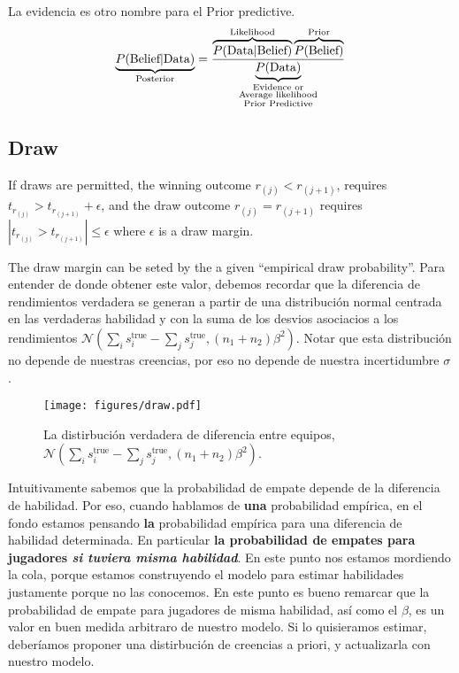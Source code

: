 \documentclass[article]{jss}
\newcommand{\N}{\mathcal{N}}
\newcommand\hfrac[2]{\genfrac{}{}{0pt}{}{#1}{#2}} %
\begin{document}

La evidencia es otro nombre para el Prior predictive.
%
\begin{equation*}
\underbrace{P(\text{Belief}|\text{Data})}_{\text{\scriptsize Posterior}} = \frac{\overbrace{P(\text{Data}|\text{Belief})}^{\text{\scriptsize Likelihood}} \overbrace{P(\text{Belief})}^{\text{\scriptsize Prior}} }{\underbrace{P(\text{Data})}_{\hfrac{\hfrac{\text{\scriptsize Evidence or}}{\text{\scriptsize Average likelihood}}}{\text{\scriptsize Prior Predictive}} } }
\end{equation*}




\subsection{Draw}

If draws are permitted, the winning outcome $r_{(j)} < r_{(j+1)}$, requires $t_{r_{(j)}} > t_{r_{(j+1)}} + \epsilon$, and the draw outcome $r_{(j)}=r_{(j+1)}$ requires $|t_{r_{(j)}} > t_{r_{(j+1)}}| \leq \epsilon$ where $\epsilon$ is a draw margin.

\vspace{0.3cm}

The draw margin can be seted by the a given ``empirical draw probability''.
Para entender de donde obtener este valor, debemos recordar que la diferencia de rendimientos verdadera se generan a partir de una distribuci\'on normal centrada en las verdaderas habilidad y con la suma de los desvios asociacios a los rendimientos $\N( \sum_i s_i^{\text{true}} - \sum_j s_j^{\text{true}},(n_1+n_2)\beta^2)$.
Notar que esta distribuci\'on no depende de nuestras creencias, por eso no depende de nuestra incertidumbre $\sigma$. 

\begin{figure}[H]
\centering
  \texttt{[image: figures/draw.pdf]}
  \caption{La distirbuci\'on verdadera de diferencia entre equipos, $\N( \sum_i s_i^{\text{true}} - \sum_j s_j^{\text{true}},(n_1+n_2)\beta^2)$.}
  \label{fig:draw}
\end{figure}

Intuitivamente sabemos que la probabilidad de empate depende de la diferencia de habilidad.
Por eso, cuando hablamos de \textbf{una} probabilidad emp\'irica, en el fondo estamos pensando \textbf{la} probabilidad emp\'irica para una diferencia de habilidad determinada.
En particular \textbf{la probabilidad de empates para jugadores \emph{si tuviera misma habilidad}}.
En este punto nos estamos mordiendo la cola, porque estamos construyendo el modelo para estimar habilidades justamente porque no las conocemos.
En este punto es bueno remarcar que la probabilidad de empate para jugadores de misma habilidad, as\'i como el $\beta$, es un valor en buen medida arbitraro de nuestro modelo.
Si lo quisieramos estimar, deber\'iamos proponer una distirbuci\'on de creencias a priori, y actualizarla con nuestro modelo.
\end{document}
